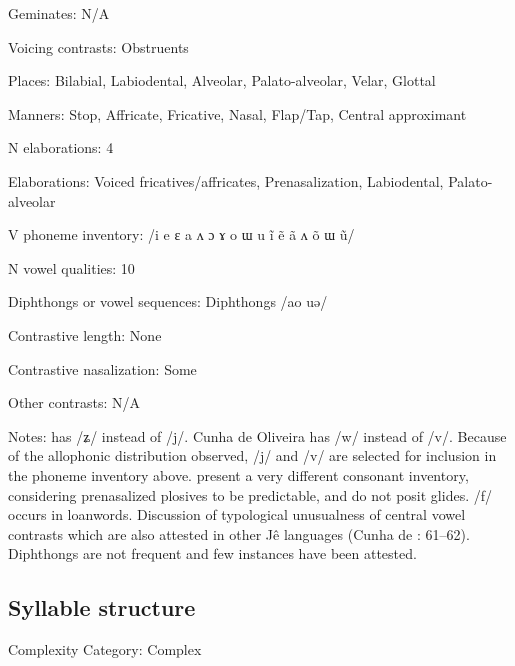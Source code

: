 {\begin{appendixdesc}
\item[Geminates:] N/A

\item[Voicing contrasts:] Obstruents

\item[Places:] Bilabial, Labiodental, Alveolar, Palato-alveolar, Velar, Glottal

\item[Manners:] Stop, Affricate, Fricative, Nasal, Flap/Tap, Central approximant

\item[N elaborations:] 4

\item[Elaborations:] Voiced fricatives/affricates, Prenasalization, Labiodental, Palato-alveolar

\item[V phoneme inventory:] /i e ɛ a ʌ ɔ ɤ o ɯ u ĩ ẽ ã ʌ õ ɯ ũ/

\item[N vowel qualities:] 10

\item[Diphthongs or vowel sequences:] Diphthongs /ao uə/

\item[Contrastive length:] None

\item[Contrastive nasalization:] Some

\item[Other contrasts:] N/A

\item[Notes:] \citet{Ham2009} has /ʑ/ instead of /j/. Cunha de Oliveira has /w/ instead of /v/. Because of the allophonic distribution observed, /j/ and /v/ are selected for inclusion in the phoneme inventory above. \citet{BurgessHam1968} present a very different consonant inventory, considering prenasalized plosives to be predictable, and do not posit glides. /f/ occurs in loanwords. Discussion of typological unusualness of central vowel contrasts which are also attested in other Jê languages (Cunha de \citealt{Oliveira2005}: 61--62). Diphthongs are not frequent and few instances have been attested.
\end{appendixdesc}
\subsection*{Syllable structure}
\begin{appendixdesc}

\item[Complexity Category:] Complex


\end{appendixdesc}}

